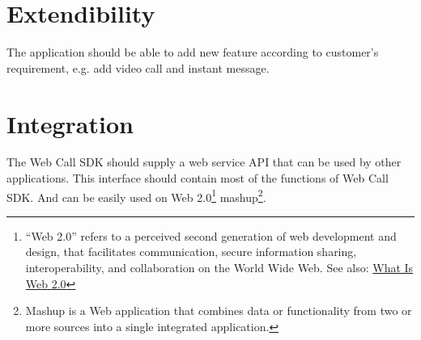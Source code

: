 \section{Extendibility}
\label{sec:Requirement:Extendibility}
The application should be able to add new feature according to customer's requirement, e.g. add video call and instant message.

\section{Integration}
\label{sec:Requirement:Integration}

The Web Call SDK should supply a web service API that can be used by other applications. This interface should contain most of the functions of Web Call SDK. And can be easily used on Web 2.0\footnote{``Web 2.0'' refers to a perceived second generation of web development and design, that facilitates communication, secure information sharing, interoperability, and collaboration on the World Wide Web.\cite{Web2dot0} See also: \href{http://www.oreillynet.com/pub/a/oreilly/tim/news/2005/09/30/what-is-web-20.html}{What Is Web 2.0}\cite{WhatIsWeb2dot0}} mashup\footnote{Mashup is a Web application that combines data or functionality from two or more sources into a single integrated application.}.

